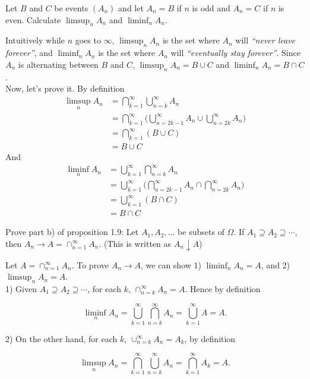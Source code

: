 \newpage
\begin{exercise}

Let $B$ and $C$ be events $(A_n)$ and let $A_n=B$ if $n$ is odd and $A_n=C$ if $n$ is even. Calculate $\limsup_{n} A_n$ and $\liminf_{n} A_n$.

\end{exercise}
\begin{solution}

Intuitively while $n$ goes to $\infty$, $\limsup_{n} A_n$ is the set where $A_n$ will \textit{``never leave forever''}, and $\liminf_{n} A_n$ is the set where $A_n$ will \textit{``eventually stay forever''}. Since $A_n$ is alternating between $B$ and $C$, $\limsup_{n} A_n = B\cup C$ and $\liminf_{n} A_n = B\cap C$. \\

Now, let's prove it. By definition
\begin{align*}
\limsup_n A_n &= \bigcap_{k=1}^\infty\bigcup_{n=k}^\infty A_n \\
  &= \bigcap_{k=1}^\infty(\bigcup_{n=2k-1}^{\infty}A_n\cup \bigcup_{n=2k}^{\infty}A_n\big) \\
  &= \bigcap_{k=1}^\infty (B\cup C) \\
  &= B \cup C
\end{align*}
And
\begin{align*}
\liminf_n A_n &= \bigcup_{k=1}^\infty\bigcap_{n=k}^\infty A_n \\
  &= \bigcup_{k=1}^\infty(\bigcap_{n=2k-1}^{\infty}A_n\cap \bigcap_{n=2k}^{\infty}A_n\big) \\
  &= \bigcup_{k=1}^\infty (B\cap C) \\
  &= B \cap C
\end{align*}

\end{solution}


\begin{exercise}
Prove part b) of proposition 1.9: Let $A_1,A_2,\ldots$ be subsets of $\Omega$. If $A_1\supseteq A_2\supseteq \cdots$, then $A_n\to A=\cap_{n=1}^\infty A_n$. (This is written as $A_n\downarrow A$)
\end{exercise}
\begin{solution}
Let $A=\cap_{n=1}^\infty A_n$. To prove $A_n\to A$, we can show 1) $\liminf_n A_n = A$, and 2) $\limsup_n A_n = A$. \\

1) Given $A_1\supseteq A_2\supseteq \cdots$, for each $k$, $\cap_{n=k}^\infty A_n=A$. Hence by definition

\[ \liminf_n A_n = \bigcup_{k=1}^\infty\bigcap_{n=k}^\infty A_n=\bigcup_{k=1}^\infty A = A .\]

2) On the other hand, for each $k$, $\cup_{n=k}^\infty A_n = A_k$, by definition

\[ \limsup_n A_n = \bigcap_{k=1}^\infty\bigcup_{n=k}^\infty A_n = \bigcap_{k=1}^\infty A_k = A .\]

\end{solution}


